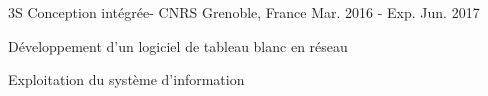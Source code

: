 \begin{cventries}
  \cventry
    {} %
    {3S Conception intégrée- CNRS} %
    {Grenoble, France} %
    {Mar. 2016 - Exp. Jun. 2017} %
    {
      \begin{cvitems} %
        \item {Développement d'un logiciel de tableau blanc en réseau}
        \item {Exploitation du système d'information}
      \end{cvitems}
    }

\end{cventries}

